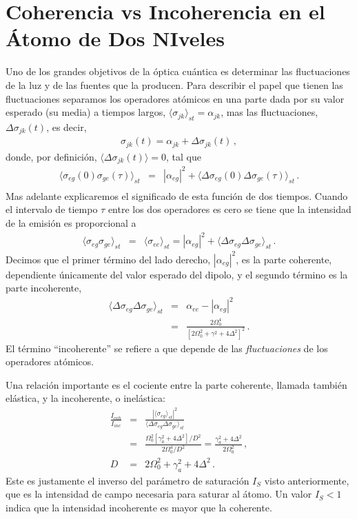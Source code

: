\documentclass[twocolumn,aps,eqsecnum]{revtex4}
\providecommand{\vxp}[1]{\langle #1 \rangle}
\begin{document}
\section{Coherencia vs Incoherencia en el \'Atomo de Dos NIveles} 
Uno de los grandes objetivos de la \'optica cu\'antica es determinar las 
fluctuaciones de la luz y de las fuentes que la producen. Para describir el 
papel que tienen las fluctuaciones separamos los operadores at\'omicos 
en una parte dada por su valor esperado (su media) a tiempos largos, 
$ \vxp{\sigma_{jk}}_{st} =\alpha_{jk}$, mas 
las fluctuaciones, $\Delta \sigma_{jk}(t)$, es decir,  
%
\begin{eqnarray} 	\label{eq:dipoleSplit}
\sigma_{jk} (t) =\alpha_{jk}  +\Delta \sigma_{jk} (t) 	\,, 
\end{eqnarray}
donde, por definici\'on, $\vxp{\Delta \sigma_{jk}(t)} =0$,  tal que 
%
\begin{eqnarray}
\vxp{\sigma_{eg} (0) \sigma_{ge} (\tau)}_{st}  
&=& |\alpha_{eg} |^2 
	+\vxp{\Delta \sigma_{eg} (0) \Delta \sigma_{ge} (\tau)}_{st} \,.
	\nonumber \\
\end{eqnarray}
Mas adelante explicaremos el significado de esta funci\'on de dos tiempos. 
Cuando el intervalo de tiempo $\tau$ entre los dos operadores es cero 
se tiene que la intensidad de la emisi\'on es proporcional a
%
\begin{eqnarray} 
\vxp{\sigma_{eg} \sigma_{ge}}_{st} 
	&=& \vxp{\sigma_{ee}}_{st} = |\alpha_{eg} |^2   
	+\vxp{\Delta \sigma_{eg} \Delta \sigma_{ge}}_{st}  \,. 
\end{eqnarray}
Decimos que el primer t\'ermino del lado derecho, $|\alpha_{eg} |^2$, 
es la parte coherente, dependiente \'unicamente del valor esperado del 
dipolo, y el segundo t\'ermino es la parte incoherente, 
%
\begin{eqnarray} 
\vxp{\Delta \sigma_{eg} \Delta \sigma_{ge}}_{st} 
	&=& \alpha_{ee} -|\alpha_{eg}|^2 		 \\  
	&=& \frac{ 2\Omega_0^4}
   	 { [ 2\Omega_0^2 +\gamma^2 +4\Delta^2 ]^2} \,.   \nonumber 
\end{eqnarray}
El t\'ermino ``incoherente'' se refiere a que depende de las 
\textit{fluctuaciones}  de los operadores at\'omicos.

Una relaci\'on importante es el cociente entre la parte coherente, llamada 
tambi\'en el\'astica, y la incoherente, o inel\'astica: 
%
\begin{eqnarray}  
\frac{I_{coh}}{I_{inc}} &=& \frac{|\vxp{\sigma_{eg}}_{st}|^2}
	{\vxp{\Delta \sigma_{eg} \Delta \sigma_{ge}}_{st}}		\\ 
&=& \frac{ \Omega_0^2 [\gamma_a^2 +4\Delta^2]/D^2 }
	{ 2 \Omega_0^4 /D^2} 
	= \frac{ \gamma_a^2 +4\Delta^2 }{ 2 \Omega_0^2} \,, \nonumber \\ 
D &=& 2\Omega_0^2 +\gamma_a^2 +4\Delta^2 \,.
\end{eqnarray}
Este es justamente el inverso del par\'ametro de saturaci\'on $I_S$ visto 
anteriormente, que es la intensidad de campo necesaria para saturar al 
\'atomo. Un valor $I_S <1$ indica que la intensidad incoherente es mayor 
que la coherente. 
\end{document}
